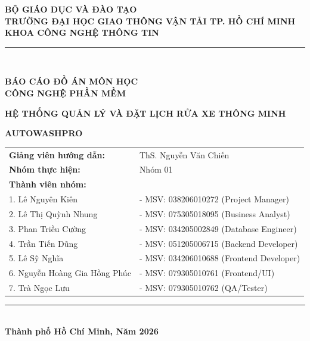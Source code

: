 \begin{titlepage}
\begin{center}
    \large \textbf{BỘ GIÁO DỤC VÀ ĐÀO TẠO} \\
    \large \textbf{TRƯỜNG ĐẠI HỌC GIAO THÔNG VẬN TẢI TP. HỒ CHÍ MINH} \\
    \large \textbf{KHOA CÔNG NGHỆ THÔNG TIN} \\
    \noindent\rule{4cm}{0.4pt} \\
    \vfill
    
    \begin{center}
    \vspace{0.5cm}
\end{center}
    
    \Large \textbf{BÁO CÁO ĐỒ ÁN MÔN HỌC} \\
    \Large \textbf{CÔNG NGHỆ PHẦN MỀM} \\
    \vfill
    
    \huge\textbf{HỆ THỐNG QUẢN LÝ VÀ ĐẶT LỊCH RỬA XE THÔNG MINH}

    \vspace{0.3cm}
    \Huge \textbf{AUTOWASHPRO} \\
    \vfill
    
    \begin{flushright}
    \large
    \begin{tabular}{ll}
        \textbf{Giảng viên hướng dẫn:} & ThS. Nguyễn Văn Chiến \\ 
        \textbf{Nhóm thực hiện:}       & Nhóm 01 \\
        \textbf{Thành viên nhóm:}      & \\
        1. Lê Nguyên Kiên              & - MSV: 038206010272 (Project Manager) \\
        2. Lê Thị Quỳnh Nhung          & - MSV: 075305018095 (Business Analyst) \\
        3. Phan Triều Cường            & - MSV: 034205002849 (Database Engineer) \\
        4. Trần Tiến Dũng              & - MSV: 051205006715 (Backend Developer) \\
        5. Lê Sỹ Nghĩa                 & - MSV: 034206010688 (Frontend Developer) \\
        6. Nguyễn Hoàng Gia Hồng Phúc  & - MSV: 079305010761 (Frontend/UI) \\
        7. Trà Ngọc Lưu                & - MSV: 079305010762 (QA/Tester) \\
    \end{tabular}
    \end{flushright}
    \vfill
    
    \noindent\rule{8cm}{0.4pt} \\
    \large \textbf{Thành phố Hồ Chí Minh, Năm 2026}
\end{center}
\end{titlepage}

